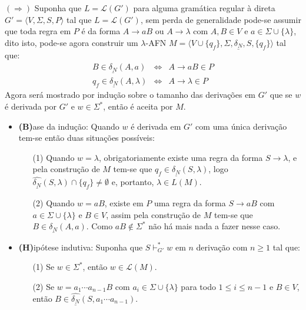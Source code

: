 \begin{prova}
	$(\Rightarrow)$ Suponha que $L = \mathcal{L}(G')$ para alguma gramática regular à direta $G' = \langle V, \Sigma, S, P \rangle$ tal que $L = \mathcal{L}(G')$, sem perda de generalidade pode-se assumir que toda regra em $P$ é da forma $A \rightarrow aB$ ou $A \rightarrow \lambda$ com $A, B \in V$ e $a \in \Sigma \cup \{\lambda\}$, dito isto, pode-se agora construir um $\lambda$-AFN $M = \langle V \cup \{q_f\}, \Sigma, \underline{\delta_N}, S, \{q_f\} \rangle$ tal que:
	\begin{eqnarray*}
		B \in \underline{\delta_N}(A, a) & \Longleftrightarrow & A \rightarrow aB \in P\\
		q_f \in \underline{\delta_N}(A, \lambda)& \Longleftrightarrow & A \rightarrow \lambda \in P
	\end{eqnarray*}
	Agora será mostrado por indução sobre o tamanho das derivações em $G'$ que se $w$ é derivada por $G'$ e $w \in \Sigma^*$, então é aceita por $M$.
	\begin{itemize}
		\item \textbf{(B)}ase da indução: Quando $w$ é derivada em $G'$ com uma única derivação tem-se então duas situações possíveis:
		\begin{itemize}
			\item[(1)] Quando $w = \lambda$, obrigatoriamente existe uma regra da forma $S \rightarrow \lambda$, e pela construção de $M$ tem-se que $q_f \in \underline{\delta_N}(S, \lambda)$, logo $\widehat{\underline{\delta_N}}(S, \lambda) \cap \{q_f\} \neq \emptyset$ e, portanto, $\lambda \in L(M)$. 
			\item[(2)] Quando $w = aB$, existe em $P$ uma regra da forma $S \rightarrow aB$ com $a \in \Sigma \cup \{\lambda\}$ e $B \in V$, assim pela construção de $M$ tem-se que $B \in \underline{\delta_N}(A, a)$. Como $aB \notin \Sigma^*$ não há mais nada a fazer nesse caso.
		\end{itemize}
		
		\item \textbf{(H)}ipótese indutiva: Suponha que $S \vdash^*_{G'} w$ em $n$ derivação com $n \geq 1$ tal que:
		\begin{itemize}
			\item[(1)] Se $w \in \Sigma^*$, então $w \in \mathcal{L}(M)$.
			\item[(2)] Se $w = a_1\cdots a_{n-1}B$ com $a_i \in \Sigma \cup \{\lambda\}$ para todo $1 \leq i \leq n-1$ e $B \in V$, então $B \in \widehat{\underline{\delta_N}}(S, a_1\cdots a_{n-1})$.
		\end{itemize}
		

\end{itemize}
\end{prova}
